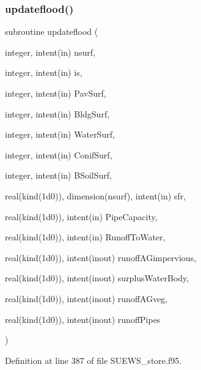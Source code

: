 \subsubsection{\texorpdfstring{updateflood()}{updateflood()}}
{\footnotesize\ttfamily subroutine updateflood (\begin{DoxyParamCaption}\item[{integer, intent(in)}]{nsurf,  }\item[{integer, intent(in)}]{is,  }\item[{integer, intent(in)}]{Pav\+Surf,  }\item[{integer, intent(in)}]{Bldg\+Surf,  }\item[{integer, intent(in)}]{Water\+Surf,  }\item[{integer, intent(in)}]{Conif\+Surf,  }\item[{integer, intent(in)}]{B\+Soil\+Surf,  }\item[{real(kind(1d0)), dimension(nsurf), intent(in)}]{sfr,  }\item[{real(kind(1d0)), intent(in)}]{Pipe\+Capacity,  }\item[{real(kind(1d0)), intent(in)}]{Runoff\+To\+Water,  }\item[{real(kind(1d0)), intent(inout)}]{runoff\+A\+Gimpervious,  }\item[{real(kind(1d0)), intent(inout)}]{surplus\+Water\+Body,  }\item[{real(kind(1d0)), intent(inout)}]{runoff\+A\+Gveg,  }\item[{real(kind(1d0)), intent(inout)}]{runoff\+Pipes }\end{DoxyParamCaption})}



Definition at line 387 of file S\+U\+E\+W\+S\+\_\+store.\+f95.

